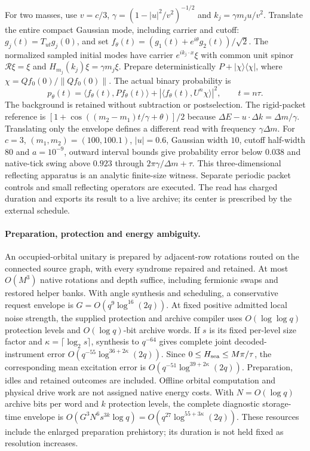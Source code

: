 For two masses, use $v=c/3$, $\gamma=(1-|u|^2/v^2)^{-1/2}$ and
$k_j=\gamma m_j u/v^2$. Translate the entire compact Gaussian mode,
including carrier and cutoff: $g_j(t)=T_{ut}g_j(0)$, and set
$f_\theta(t)=(g_1(t)+e^{i\theta}g_2(t))/\sqrt2$.
The normalized sampled initial modes have carrier $e^{ik_j\cdot x}\xi$
with common unit spinor $\mathcal R\xi=\xi$ and
$H_{m_j}(k_j)\xi=\gamma m_j\xi$.
Prepare deterministically $P+|\chi\rangle\langle\chi|$, where
$\chi=Qf_0(0)/\|Qf_0(0)\|$. The actual binary probability is
\[
 p_\theta(t)=\langle f_\theta(t),Pf_\theta(t)\rangle+
                |\langle f_\theta(t),U^n\chi\rangle|^2,\qquad t=n\tau.
\]
The background is retained without subtraction or postselection. The
rigid-packet reference is $[1+\cos((m_2-m_1)t/\gamma+\theta)]/2$ because
$\Delta E-u\cdot\Delta k=\Delta m/\gamma$. Translating only the envelope
defines a different read with frequency $\gamma\Delta m$.
For $c=3$, $(m_1,m_2)=(100,100.1)$, $|u|=0.6$, Gaussian width $10$,
cutoff half-width $80$ and $a=10^{-9}$, outward interval bounds give
probability error below $0.038$ and native-tick swing above $0.923$
through $2\pi\gamma/\Delta m+\tau$. This three-dimensional reflecting
apparatus is an analytic finite-size witness. Separate periodic packet
controls and small reflecting operators are executed. The read has charged
duration and exports its result to a live archive; its center is prescribed
by the external schedule.

\paragraph{Preparation, protection and energy ambiguity.}
An occupied-orbital unitary is prepared by adjacent-row rotations routed
on the connected source graph, with every syndrome repaired and retained.
At most $O(M^3)$ native rotations and depth suffice, including fermionic
swaps and restored helper banks. With angle synthesis and scheduling, a
conservative request envelope is $G=O(q^9\log^{16}(2q))$.
At fixed positive admitted local noise strength, the supplied protection
and archive compiler uses $O(\log\log q)$ protection levels and
$O(\log q)$-bit archive words. If $s$ is its fixed per-level size factor
and $\kappa=\lceil\log_2s\rceil$, synthesis to $q^{-64}$ gives complete
joint decoded-instrument error $O(q^{-55}\log^{36+2\kappa}(2q))$.
Since $0\le H_{\rm sea}\le M\pi/\tau$, the corresponding mean excitation
error is $O(q^{-51}\log^{39+2\kappa}(2q))$. Preparation, idles and retained
outcomes are included. Offline orbital computation and physical drive work
are not assigned native energy costs.
With $N=O(\log q)$ archive bits per word and $k$ protection levels,
the complete diagnostic storage-time envelope is
$O(G^3N^6s^{3k}\log q)=O(q^{27}\log^{55+3\kappa}(2q))$.
These resources include the enlarged preparation prehistory; its duration
is not held fixed as resolution increases.

